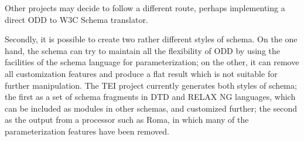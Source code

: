 Other projects may decide to follow a different route, perhaps implementing a direct ODD to W3C Schema translator.\par
Secondly, it is possible to create two rather different styles of schema. On the one hand, the schema can try to maintain all the flexibility of ODD by using the facilities of the schema language for parameterization; on the other, it can remove all customization features and produce a flat result which is not suitable for further manipulation. The TEI project currently generates both styles of schema; the first as a set of schema fragments in DTD and RELAX NG languages, which can be included as modules in other schemas, and customized further; the second as the output from a processor such as Roma, in which many of the parameterization features have been removed.\par
